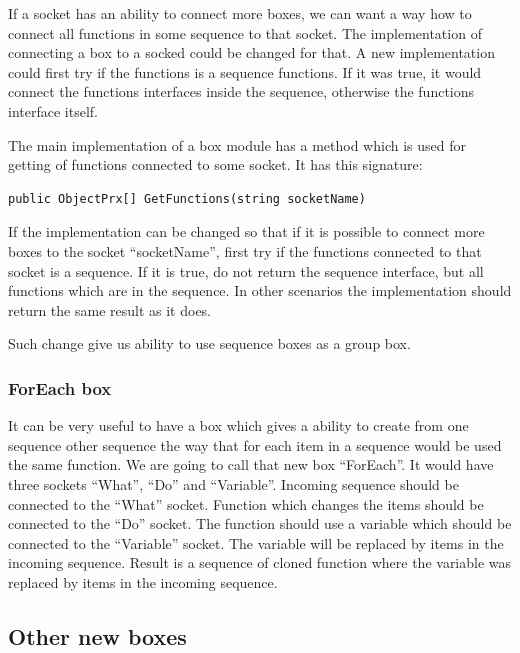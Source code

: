 \documentclass[a4paper,12pt]{book}
\begin{document}
If a socket has an ability to connect more boxes, we can want a way how to connect all functions in some sequence to that socket. The implementation of connecting a box to a socked could be changed for that. A new implementation could first try if the functions is a sequence functions. If it was true, it would connect the functions interfaces inside the sequence, otherwise the functions interface itself.

The main implementation of a box module has a method which is used for getting of functions connected to some socket. It has this signature:
\begin{verbatim}
public ObjectPrx[] GetFunctions(string socketName)
\end{verbatim}

If the implementation can be changed so that if it is possible to connect more boxes to the socket ``socketName'', first try if the functions connected to that socket is a sequence. If it is true, do not return the sequence interface, but all functions which are in the sequence. In other scenarios the implementation should return the same result as it does.

Such change give us ability to use sequence boxes as a group box.

\subsubsection{ForEach box}
It can be very useful to have a box which gives a ability to create from one sequence other sequence the way that for each item in a sequence would be used the same function. We are going to call that new box ``ForEach''. It would have three sockets ``What'', ``Do'' and ``Variable''. Incoming sequence should be connected to the ``What'' socket. Function which changes the items should be connected to the ``Do'' socket. The function should use a variable which should be connected to the ``Variable'' socket. The variable will be replaced by items in the incoming sequence. Result is a sequence of cloned function where the variable was replaced by items in the incoming sequence. 

\subsection{Other new boxes}
\end{document}

